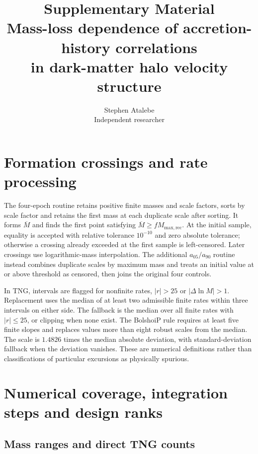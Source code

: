 \documentclass[11pt,a4paper]{article}
\title{Supplementary Material\\\large Mass-loss dependence of accretion-history correlations\\in dark-matter halo velocity structure}
\author{Stephen Atalebe\\\small Independent researcher}
\date{}
\newcommand{\Mrec}{M_{\mathrm{max,rec}}}
\begin{document}
\maketitle
\section{Formation crossings and rate processing}\label{sup:definitions}
The four-epoch routine retains positive finite masses and scale factors, sorts by scale factor and retains the first mass at each duplicate scale after sorting. It forms $\overline M$ and finds the first point satisfying $\overline M\geq f\Mrec$. At the initial sample, equality is accepted with relative tolerance $10^{-10}$ and zero absolute tolerance; otherwise a crossing already exceeded at the first sample is left-censored. Later crossings use logarithmic-mass interpolation. The additional $a_{05}/a_{90}$ routine instead combines duplicate scales by maximum mass and treats an initial value at or above threshold as censored, then joins the original four controls.

In TNG, intervals are flagged for nonfinite rates, $|r|>25$ or $|\Delta\ln M|>1$. Replacement uses the median of at least two admissible finite rates within three intervals on either side. The fallback is the median over all finite rates with $|r|\leq25$, or clipping when none exist. The BolshoiP rule requires at least five finite slopes and replaces values more than eight robust scales from the median. The scale is $1.4826$ times the median absolute deviation, with standard-deviation fallback when the deviation vanishes. These are numerical definitions rather than classifications of particular excursions as physically spurious.

\section{Numerical coverage, integration steps and design ranks}\label{sup:coverage}
\subsection{Mass ranges and direct TNG counts}
\begin{table}[htbp]\centering\small

\caption{Physical terminal-mass ranges in the available baseline populations, using each family's documented numerical convention. They do not imply equivalent halo mass definitions.}\label{tab:massranges}
\end{table}
\begin{table}[htbp]\centering\small

\caption{Direct dark-matter particle counts in the TNG trees. A small historical minimum characterizes the sampled record; it is not a convergence assessment.}\label{tab:particles}
\end{table}
\end{document}
